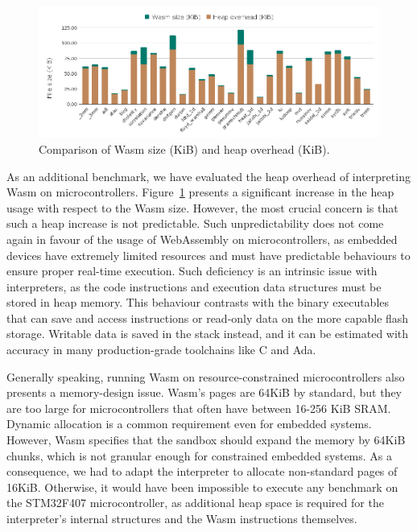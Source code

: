 \begin{figure}[ht]
\centering
\includegraphics[width=\columnwidth]{figures/b-wasmi-1}
\caption{Comparison of Wasm size (KiB) and heap overhead (KiB).}
\label{fig:b-wasmi-1}
\end{figure}

As an additional benchmark, we have evaluated the heap overhead of interpreting Wasm on microcontrollers. 
Figure~\ref{fig:b-wasmi-1} presents a significant increase in the heap usage with respect to the Wasm size. However, the most crucial concern is that such a heap increase is not predictable. Such unpredictability does not come again in favour of the usage of WebAssembly on microcontrollers, as embedded devices have extremely limited resources and must have predictable behaviours to ensure proper real-time execution. Such deficiency is an intrinsic issue with interpreters, as the code instructions and execution data structures must be stored in heap memory. This behaviour contrasts with the binary executables that can save and access instructions or read-only data on the more capable flash storage. Writable data is saved in the stack instead, and it can be estimated with accuracy in many production-grade toolchains like C and Ada.

Generally speaking, running Wasm on resource-constrained microcontrollers also presents a memory-design issue. Wasm's pages are 64KiB by standard, but they are too large for microcontrollers that often have between 16-256 KiB SRAM. Dynamic allocation is a common requirement even for embedded systems. However, Wasm specifies that the sandbox should expand the memory by 64KiB chunks, which is not granular enough for constrained embedded systems. As a consequence, we had to adapt the interpreter to allocate non-standard pages of 16KiB. Otherwise, it would have been impossible to execute any benchmark on the STM32F407 microcontroller, as additional heap space is required for the interpreter's internal structures and the Wasm instructions themselves.

